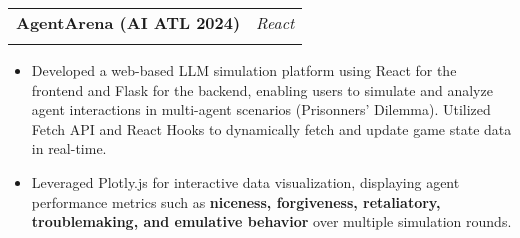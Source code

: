 \documentclass[letterpaper,11pt]{article}
\makeatletter
\newcommand{\resumeItem}[1]{
  \item\small{
    {#1 \vspace{-2pt}}
  }
}
\newcommand{\resumeSubheading}[4]{
  \vspace{-2pt}\item
    \begin{tabular*}{0.97\textwidth}[t]{l@{\extracolsep{\fill}}r}
      \textbf{#1} & #2 \\
      \textit{\small#3} & \textit{\small #4} \\
    \end{tabular*}\vspace{-7pt}
}
\newcommand{\resumeItemListStart}{\begin{itemize}}
\newcommand{\resumeItemListEnd}{\end{itemize}\vspace{-8pt}}
\makeatother
\begin{document}

    \resumeSubheading
    {AgentArena (AI ATL 2024)}{\textit{React}}
    {}{}
    \resumeItemListStart
    \vspace{-5mm}
      \resumeItem{Developed a web-based LLM simulation platform using React for the frontend and Flask for the backend, enabling users to simulate and analyze agent interactions in multi-agent scenarios (Prisonners' Dilemma). Utilized Fetch API and React Hooks to dynamically fetch and update game state data in real-time.}
      \resumeItem{Leveraged Plotly.js for interactive data visualization, displaying agent performance metrics such as \textbf{niceness, forgiveness, retaliatory, troublemaking, and emulative behavior} over multiple simulation rounds.}
    \resumeItemListEnd
  

    
      
\end{document}
